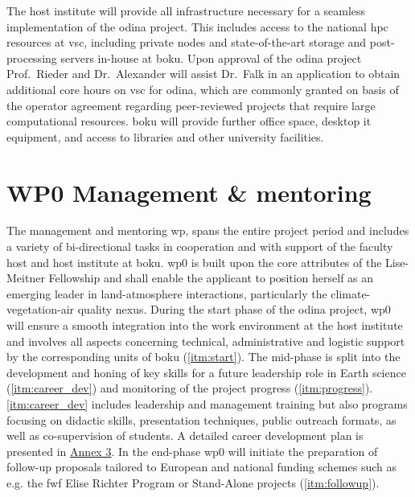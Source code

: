 The host institute will provide all infrastructure necessary for a seamless implementation of the \gls{odina} project. This includes access to the national \gls{hpc} resources at \gls{vsc}, including private nodes and state-of-the-art storage and post-processing servers in-house at \gls{boku}. Upon approval of the \gls{odina} project Prof.~Rieder and Dr.~Alexander will assist Dr.~Falk in an application to obtain additional core hours on \gls{vsc} for \gls{odina}, which are commonly granted on basis of the operator agreement regarding peer-reviewed projects that require large computational resources. \gls{boku} will provide further office space, desktop \acrshort{it} equipment, and access to libraries and other university facilities. 

\vspace{-0.5\baselineskip}
\section{WP0 Management \& mentoring}
\label{sec:wp0}
The management and mentoring \gls{wp}, spans the entire project period and includes a variety of bi-directional tasks in cooperation and with support of the faculty host and host institute at \gls{boku}. \gls{wp}0 is built upon the core attributes of the Lise-Meitner Fellowship and shall enable the applicant to position herself as an emerging leader in land-atmosphere interactions, particularly the climate-vegetation-air quality nexus. During the start phase of the \gls{odina} project, \gls{wp}0 will ensure a smooth integration into the work environment at the host institute and involves all aspects concerning technical, administrative and logistic support by the corresponding units of \gls{boku} (\ref{itm:start}). The mid-phase is split into the development and honing of key skills for a future leadership role in Earth science (\ref{itm:career_dev}) and monitoring of the project progress (\ref{itm:progress}). \ref{itm:career_dev} includes leadership and management training but also programs focusing on didactic skills, presentation techniques, public outreach formats, as well as co-supervision of students. A detailed career development plan is presented in \hyperref[appendix:career]{Annex 3}. In the end-phase \gls{wp}0 will initiate the preparation of follow-up proposals tailored to European and national funding schemes such as e.g. the \gls{fwf} Elise Richter Program or Stand-Alone projects (\ref{itm:followup}).

\vspace{-0.5\baselineskip}
